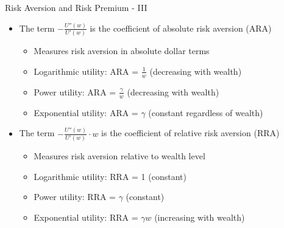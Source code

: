 \documentclass[10pt,handout]{beamer}
\begin{document}
\begin{frame}{Risk Aversion and Risk Premium - III}
    \begin{itemize}[<+->]
      \item The term $-\frac{U''(w)}{U'(w)}$ is the coefficient of absolute risk aversion (ARA)
        \begin{itemize}
          \item Measures risk aversion in absolute dollar terms
          \item Logarithmic utility: ARA = $\frac{1}{w}$ (decreasing with wealth)
          \item Power utility: ARA = $\frac{\gamma}{w}$ (decreasing with wealth)
          \item Exponential utility: ARA = $\gamma$ (constant regardless of wealth)
        \end{itemize}
      \item The term $-\frac{U''(w)}{U'(w)} \cdot w$ is the coefficient of relative risk aversion (RRA)
        \begin{itemize}
          \item Measures risk aversion relative to wealth level
          \item Logarithmic utility: RRA = 1 (constant)
          \item Power utility: RRA = $\gamma$ (constant)
          \item Exponential utility: RRA = $\gamma w$ (increasing with wealth)
        \end{itemize}
    \end{itemize}
\end{frame}
\end{document}

